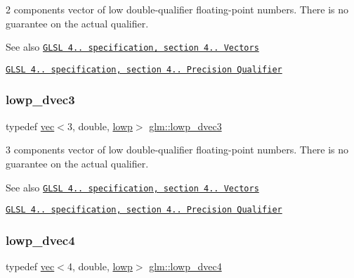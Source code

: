 2 components vector of low double-\/qualifier floating-\/point numbers. There is no guarantee on the actual qualifier.

\begin{DoxySeeAlso}{See also}
\href{http://www.opengl.org/registry/doc/GLSLangSpec.4.20.8.pdf}{\tt G\+L\+SL 4.. specification, section 4.. Vectors} 

\href{http://www.opengl.org/registry/doc/GLSLangSpec.4.20.8.pdf}{\tt G\+L\+SL 4.. specification, section 4.. Precision Qualifier} 
\end{DoxySeeAlso}
\mbox{\label{group__core__precision_gaf59ddbed824c80439be0a04a1a46d520}} 
\subsubsection{\texorpdfstring{lowp\+\_\+dvec3}{lowp\_dvec3}}
{\footnotesize\ttfamily typedef \mbox{\hyperlink{structglm_1_1vec}{vec}}$<$3, double, \mbox{\hyperlink{namespaceglm_a36ed105b07c7746804d7fdc7cc90ff25ae161af3fc695e696ce3bf69f7332bc2d}{lowp}}$>$ \mbox{\hyperlink{group__core__precision_gaf59ddbed824c80439be0a04a1a46d520}{glm\+::lowp\+\_\+dvec3}}}

3 components vector of low double-\/qualifier floating-\/point numbers. There is no guarantee on the actual qualifier.

\begin{DoxySeeAlso}{See also}
\href{http://www.opengl.org/registry/doc/GLSLangSpec.4.20.8.pdf}{\tt G\+L\+SL 4.. specification, section 4.. Vectors} 

\href{http://www.opengl.org/registry/doc/GLSLangSpec.4.20.8.pdf}{\tt G\+L\+SL 4.. specification, section 4.. Precision Qualifier} 
\end{DoxySeeAlso}
\mbox{\label{group__core__precision_gae88de6eaf7152399bdbc2687a76407c4}} 
\subsubsection{\texorpdfstring{lowp\+\_\+dvec4}{lowp\_dvec4}}
{\footnotesize\ttfamily typedef \mbox{\hyperlink{structglm_1_1vec}{vec}}$<$4, double, \mbox{\hyperlink{namespaceglm_a36ed105b07c7746804d7fdc7cc90ff25ae161af3fc695e696ce3bf69f7332bc2d}{lowp}}$>$ \mbox{\hyperlink{group__core__precision_gae88de6eaf7152399bdbc2687a76407c4}{glm\+::lowp\+\_\+dvec4}}}

